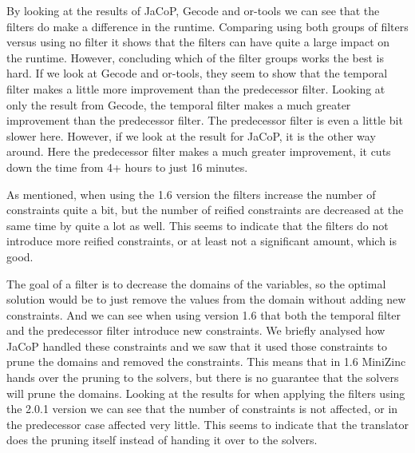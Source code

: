 By looking at the results of JaCoP, Gecode and or-tools we can see that the filters do make a difference in the runtime. Comparing using both groups of filters versus using no filter it shows that the filters can have quite a large impact on the runtime. However, concluding which of the filter groups works the best is hard. If we look at Gecode and or-tools, they seem to show that the temporal filter makes a little more improvement than the predecessor filter. Looking at only the result from Gecode, the temporal filter makes a much greater improvement than the predecessor filter. The predecessor filter is even a little bit slower here. However, if we look at the result for JaCoP, it is the other way around. Here the predecessor filter makes a much greater improvement, it cuts down the time from 4+ hours to just 16 minutes.

As mentioned, when using the 1.6 version the filters increase the number of constraints quite a bit, but the number of reified constraints are decreased at the same time by quite a lot as well. This seems to indicate that the filters do not introduce more reified constraints, or at least not a significant amount, which is good.

The goal of a filter is to decrease the domains of the variables, so the optimal solution would be to just remove the values from the domain without adding new constraints. And we can see when using version 1.6 that both the temporal filter and the predecessor filter introduce new constraints. We briefly analysed how JaCoP handled these constraints and we saw that it used those constraints to prune the domains and removed the constraints. This means that in 1.6 MiniZinc hands over the pruning to the solvers, but there is no guarantee that the solvers will prune the domains. Looking at the results for when applying the filters using the 2.0.1 version we can see that the number of constraints is not affected, or in the predecessor case affected very little. This seems to indicate that the translator does the pruning itself instead of handing it over to the solvers.



